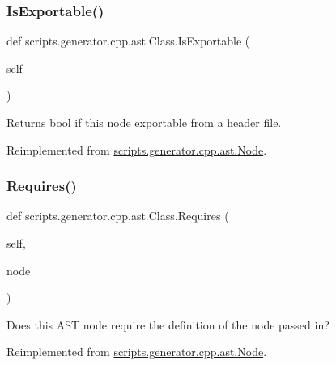 \mbox{\label{classscripts_1_1generator_1_1cpp_1_1ast_1_1_class_a56180abf003818d8d244fb38b4845e0e}} 
\subsubsection{\texorpdfstring{IsExportable()}{IsExportable()}}
{\footnotesize\ttfamily def scripts.\+generator.\+cpp.\+ast.\+Class.\+Is\+Exportable (\begin{DoxyParamCaption}\item[{}]{self }\end{DoxyParamCaption})}

\begin{DoxyVerb}Returns bool if this node exportable from a header file.\end{DoxyVerb}
 

Reimplemented from \mbox{\hyperlink{classscripts_1_1generator_1_1cpp_1_1ast_1_1_node_a298c446d34e08a78b5ebb477eb55863b}{scripts.\+generator.\+cpp.\+ast.\+Node}}.

\mbox{\label{classscripts_1_1generator_1_1cpp_1_1ast_1_1_class_a5eccc02b0b7bb9c38a01cd6f50802b08}} 
\subsubsection{\texorpdfstring{Requires()}{Requires()}}
{\footnotesize\ttfamily def scripts.\+generator.\+cpp.\+ast.\+Class.\+Requires (\begin{DoxyParamCaption}\item[{}]{self,  }\item[{}]{node }\end{DoxyParamCaption})}

\begin{DoxyVerb}Does this AST node require the definition of the node passed in?\end{DoxyVerb}
 

Reimplemented from \mbox{\hyperlink{classscripts_1_1generator_1_1cpp_1_1ast_1_1_node_a37c4215d199947155270a485a3add21e}{scripts.\+generator.\+cpp.\+ast.\+Node}}.



